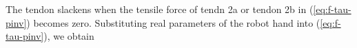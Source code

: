 \documentclass{llncs}
\begin{document}
The tendon slackens when the tensile force of tendn 2a or tendon 2b in (\ref{eq:f-tau-pinv}) becomes zero.
Substituting real parameters of the robot hand into (\ref{eq:f-tau-pinv}), we obtain
\end{document}
